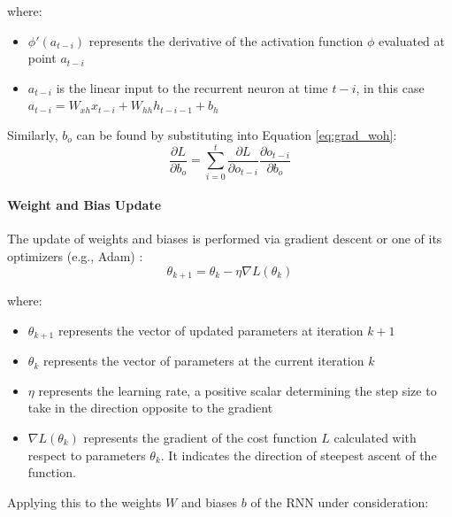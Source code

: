 where:
\begin{itemize}
\item $\phi'(a_{t-i})$ represents the derivative of the activation function $\phi$ evaluated at point $a_{t-i}$
\item $a_{t-i}$ is the linear input to the recurrent neuron at time $t-i$, in this case $a_{t-i}=W_{xh}x_{t-i} + W_{hh} h_{t-i-1} + b_h $
\end{itemize}

Similarly, $b_o$ can be found by substituting into Equation \ref{eq:grad_woh}:
\begin{equation}
\frac{\partial L}{\partial b_{o}} = \sum_{i=0}^{t} \frac{\partial L}{\partial o_{t-i}} \frac{\partial o_{t-i}}{\partial b_{o}}
\end{equation}

\paragraph{Weight and Bias Update} The update of weights and biases is performed via gradient descent or one of its optimizers (e.g., Adam) \cite{quarkml-bptt}:
\begin{equation}
 \theta_{k+1} = \theta_k - \eta \nabla L(\theta_k)
\end{equation}

where:
\begin{itemize}
\item $\theta_{k+1}$ represents the vector of updated parameters at iteration $k+1$
\item $\theta_{k}$ represents the vector of parameters at the current iteration $k$
\item $\eta$ represents the learning rate, a positive scalar determining the step size to take in the direction opposite to the gradient
\item $\nabla L(\theta_{k})$ represents the gradient of the cost function $L$ calculated with respect to parameters $\theta_k$. It indicates the direction of steepest ascent of the function.
\end{itemize}

Applying this to the weights $W$ and biases $b$ of the RNN under consideration:

